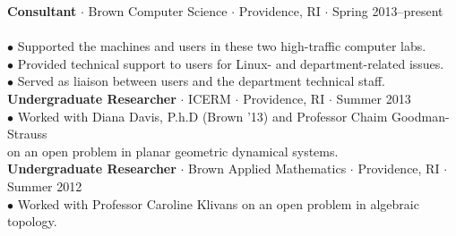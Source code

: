 \documentclass{res}
\begin{document}
\begin{resume}
\begin{tabbing}
\sbreak
{\bf Consultant} $\cdot$ Brown Computer Science $\cdot$ Providence, RI $\cdot$ Spring 2013--present\\
	\\
	\>$\bullet$ Supported the machines and users in these two high-traffic computer labs.\\
	\>$\bullet$ Provided technical support to users for Linux- and department-related issues.\\
	\>$\bullet$ Served as  liaison between users and the department technical staff.\\
\sbreak
{\bf Undergraduate Researcher} $\cdot$ ICERM $\cdot$ Providence, RI $\cdot$ Summer 2013\\
	\>$\bullet$ Worked with Diana Davis, P.h.D (Brown '13) and Professor Chaim Goodman-Strauss\\\>\phantom{$\bullet$} on an open problem in planar geometric dynamical systems.\\
\sbreak	
{\bf Undergraduate Researcher} $\cdot$ Brown Applied Mathematics $\cdot$ Providence, RI $\cdot$ Summer 2012\\
\>$\bullet$ Worked with Professor Caroline Klivans on an open problem in algebraic topology.\\



   \end{tabbing}
\sectionVspace %

\end{resume}
\end{document}
